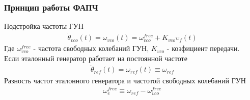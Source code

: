 \documentclass{beamer}
\begin{document}
\begin{frame}
\frametitle{Принцип работы ФАПЧ}
\begin{center}
\end{center}
Подстройка частоты ГУН
 \begin{equation}
 \begin{aligned}
\dot{\theta}_{vco}(t) = \omega_{vco}(t) = \omega^{free}_{vco} + K_{vco}\upsilon_f(t)
 \end{aligned}
\end{equation}
Где $\omega^{free}_{vco}$ - частота свободных колебаний ГУН, $K_{vco}$ - коэфициент передачи. \\
Если эталонный генератор работает на постоянной частоте
 \begin{equation}
 \begin{aligned}
\dot{\theta}_{ref}(t) = \omega_{ref}(t) \equiv \omega_{ref}
 \end{aligned}
\end{equation}
Разность частот эталонного генератора и частотой свободных колебаний ГУН
 \begin{equation}
 \begin{aligned}
\omega_e^{free} \equiv \omega_{ref} - \omega^{free}_{vco}
 \end{aligned}
\end{equation}
\end{frame}
\end{document}
